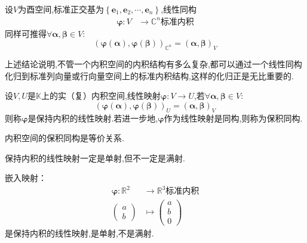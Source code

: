    设$V$为酉空间,标准正交基为$\left\{
        \bm{e}_1,\bm{e}_2,\cdots,\bm{e}_n
        \right\}$,线性同构\begin{align*}
            \bm{\varphi}:V&\longrightarrow\mathbb{C}^n\text{标准内积}
        \end{align*}同样可推得$\forall\bm{\alpha},\bm{\beta}\in V:$\[
        \left(
            \bm{\varphi}\left(\bm{\alpha}\right),\bm{\varphi}\left(\bm{\beta}\right)
        \right)_{\mathbb{C}^n}=\left(
            \bm{\alpha},\bm{\beta}
        \right)_V
        \]
        \begin{red}
            \begin{remark}
                上述结论说明,不管一个内积空间的内积结构有多么复杂,都可以通过一个线性同构化归到标准列向量或行向量空间上的标准内积结构,这样的化归正是无比重要的.
            \end{remark}
        \end{red}
\begin{formal}
    \begin{definition}[保积同构的定义]\label{def:保积同构的定义}
        设$V,U$是$\mathbb{K}$上的实（复）内积空间,线性映射$\bm{\varphi}:V\longrightarrow U$,若$\forall\bm{\alpha},\bm{\beta}\in V:$\[
        \left(
            \bm{\varphi}\left(\bm{\alpha}\right),\bm{\varphi}\left(\bm{\beta}\right)
        \right)_U=\left(
            \bm{\alpha},\bm{\beta}
        \right)_V
        \]则称$\bm{\varphi}$是保持内积的线性映射.若进一步地,$\bm{\varphi}$作为线性映射是同构,则称为保积同构.
    \end{definition}
\end{formal}
\begin{red}
    \begin{remark}
        内积空间的保积同构是等价关系.
    \end{remark}
\end{red}
\begin{red}
    \begin{remark}
        保持内积的线性映射一定是单射,但不一定是满射.
    \end{remark}
\end{red}
\begin{brown}
    \begin{example}
        嵌入映射：\begin{align*}
            \bm{\varphi}:\mathbb{R}^2&\longrightarrow\mathbb{R}^3\text{标准内积}\\
            \begin{pmatrix}
                a\\b
            \end{pmatrix}&\longmapsto\begin{pmatrix}
                a\\b\\0
            \end{pmatrix}
        \end{align*}是保持内积的线性映射,是单射,不是满射.
    \end{example}
\end{brown}
